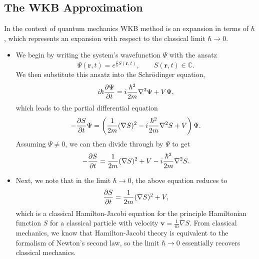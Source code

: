 \documentclass[11pt, a4paper]{article}
\renewcommand{\grad}{\nabla}
\renewcommand{\laplacian}{\nabla^{2}}
\newcommand{\Schro}{Schr\"{o}dinger\xspace}
\renewcommand{\vec}[1]{\bm{#1}}  %
\renewcommand{\r}{\vec{r}}  %
\begin{document}
\subsection{The WKB Approximation}
    In the context of quantum mechanics WKB method is an expansion in terms of $ \hbar $, which represents an expansion with respect to the classical limit $ \hbar \to 0 $. 
\begin{itemize}

    \item We begin by writing the system's wavefunction $ \Psi $ with the ansatz 
    \begin{equation*}
        \Psi(\r, t) = e^{\frac{i}{\hbar}S(\r, t)}, \qquad S(\r, t) \in \mathbb{C}.
    \end{equation*}
    We then substitute this ansatz into the \Schro equation,
    \begin{equation*}
        i \hbar \pdv{\Psi}{t} = i \frac{\hbar^{2}}{2m}\laplacian \Psi + V \Psi,
    \end{equation*}
    which leads to the partial differential equation
    \begin{equation*}
        - \pdv{S}{t}\Psi = \left( \frac{1}{2m}(\grad S)^{2} - i \frac{\hbar^{2}}{2m} \laplacian S + V \right)\Psi.
    \end{equation*}
    Assuming $ \Psi \neq 0 $, we can then divide through by $ \Psi $ to get
    \begin{equation*}
        -\pdv{S}{t} = \frac{1}{2m}(\grad S)^{2} + V - i \frac{\hbar^{2}}{2m}\laplacian S.
    \end{equation*}
    
    \item Next, we note that in the limit $ \hbar \to 0 $, the above equation reduces to
    \begin{equation*}
        \pdv{S}{t} = \frac{1}{2m}(\grad S)^{2} + V,
    \end{equation*}
    which is a classical Hamilton-Jacobi equation for the principle Hamiltonian function $ S $ for a classical particle with velocity $ \vec{v} = \frac{1}{m}\grad S $. From classical mechanics, we know that Hamilton-Jacobi theory is equivalent to the formalism of Newton's second law, so the limit $ \hbar \to 0 $ essentially recovers classical mechanics.
    

\end{itemize}
\end{document}
